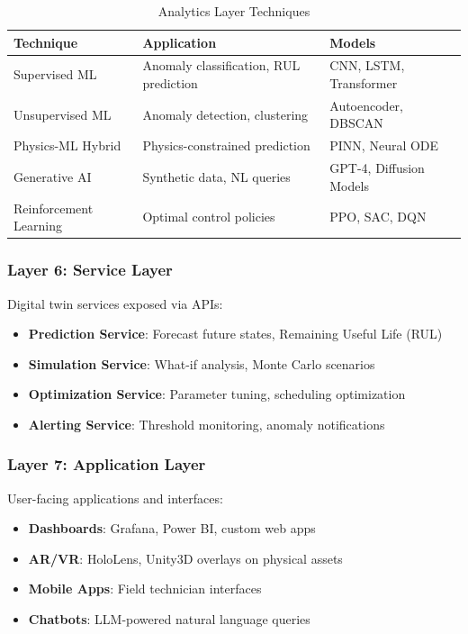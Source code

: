 \documentclass[12pt,a4paper]{article}
\begin{document}
\begin{table}[H]
\centering
\caption{Analytics Layer Techniques}
\begin{tabular}{lll}
\toprule
\textbf{Technique} & \textbf{Application} & \textbf{Models} \\
\midrule
Supervised ML & Anomaly classification, RUL prediction & CNN, LSTM, Transformer \\
Unsupervised ML & Anomaly detection, clustering & Autoencoder, DBSCAN \\
Physics-ML Hybrid & Physics-constrained prediction & PINN, Neural ODE \\
Generative AI & Synthetic data, NL queries & GPT-4, Diffusion Models \\
Reinforcement Learning & Optimal control policies & PPO, SAC, DQN \\
\bottomrule
\end{tabular}
\end{table}

\subsubsection{Layer 6: Service Layer}

Digital twin services exposed via APIs:

\begin{itemize}
    \item \textbf{Prediction Service}: Forecast future states, Remaining Useful Life (RUL)
    \item \textbf{Simulation Service}: What-if analysis, Monte Carlo scenarios
    \item \textbf{Optimization Service}: Parameter tuning, scheduling optimization
    \item \textbf{Alerting Service}: Threshold monitoring, anomaly notifications
\end{itemize}

\subsubsection{Layer 7: Application Layer}

User-facing applications and interfaces:

\begin{itemize}
    \item \textbf{Dashboards}: Grafana, Power BI, custom web apps
    \item \textbf{AR/VR}: HoloLens, Unity3D overlays on physical assets
    \item \textbf{Mobile Apps}: Field technician interfaces
    \item \textbf{Chatbots}: LLM-powered natural language queries
\end{itemize}
\end{document}
